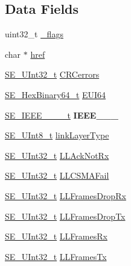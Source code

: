 \subsection*{Data Fields}
\begin{DoxyCompactItemize}
\item 
uint32\+\_\+t \hyperlink{group__LLInterface_gaa0dc55efd407aa5396ed13e3a59692a7}{\+\_\+flags}
\item 
char $\ast$ \hyperlink{group__LLInterface_ga1215360f15eba876078292b78bee513a}{href}
\item 
\hyperlink{group__UInt32_ga70bd4ecda3c0c85d20779d685a270cdb}{S\+E\+\_\+\+U\+Int32\+\_\+t} \hyperlink{group__LLInterface_gae30861c0bcee76e4fb3d6595c0627ee4}{C\+R\+Cerrors}
\item 
\hyperlink{group__HexBinary64_ga718baff6d79d03afcdd37d53265c4684}{S\+E\+\_\+\+Hex\+Binary64\+\_\+t} \hyperlink{group__LLInterface_ga04a90ef4163eeb75c14b51dc355c230b}{E\+U\+I64}
\item 
\hyperlink{structSE__IEEE__802__15__4__t}{S\+E\+\_\+\+I\+E\+E\+E\+\_\+\_\+\_\+\_\+t} {\bfseries I\+E\+E\+E\+\_\+\_\+\_}
\item 
\hyperlink{group__UInt8_gaf7c365a1acfe204e3a67c16ed44572f5}{S\+E\+\_\+\+U\+Int8\+\_\+t} \hyperlink{group__LLInterface_ga8ef715e1733f7b500277f889214fc442}{link\+Layer\+Type}
\item 
\hyperlink{group__UInt32_ga70bd4ecda3c0c85d20779d685a270cdb}{S\+E\+\_\+\+U\+Int32\+\_\+t} \hyperlink{group__LLInterface_ga55320632c0236c217127525559c57b8b}{L\+L\+Ack\+Not\+Rx}
\item 
\hyperlink{group__UInt32_ga70bd4ecda3c0c85d20779d685a270cdb}{S\+E\+\_\+\+U\+Int32\+\_\+t} \hyperlink{group__LLInterface_gabf6b980a7cdfc4791c5d1454186ccd97}{L\+L\+C\+S\+M\+A\+Fail}
\item 
\hyperlink{group__UInt32_ga70bd4ecda3c0c85d20779d685a270cdb}{S\+E\+\_\+\+U\+Int32\+\_\+t} \hyperlink{group__LLInterface_ga35a45921948c27fb0592c48d649eeeff}{L\+L\+Frames\+Drop\+Rx}
\item 
\hyperlink{group__UInt32_ga70bd4ecda3c0c85d20779d685a270cdb}{S\+E\+\_\+\+U\+Int32\+\_\+t} \hyperlink{group__LLInterface_ga0bf6d4a7c6b0fcc3abf05c0f6fe0d9a2}{L\+L\+Frames\+Drop\+Tx}
\item 
\hyperlink{group__UInt32_ga70bd4ecda3c0c85d20779d685a270cdb}{S\+E\+\_\+\+U\+Int32\+\_\+t} \hyperlink{group__LLInterface_ga90c38987e2ab44715a8f858b2cb16fcc}{L\+L\+Frames\+Rx}
\item 
\hyperlink{group__UInt32_ga70bd4ecda3c0c85d20779d685a270cdb}{S\+E\+\_\+\+U\+Int32\+\_\+t} \hyperlink{group__LLInterface_ga85a2342a247104a6ad9cbf1b0453dea2}{L\+L\+Frames\+Tx}

\end{DoxyCompactItemize}
